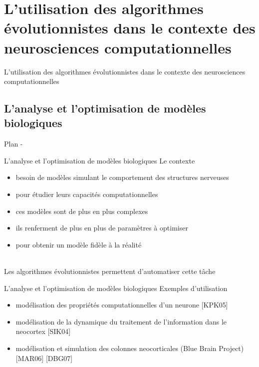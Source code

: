 \documentclass{beamer}
\begin{document}
\section{L'utilisation des algorithmes évolutionnistes dans le contexte des
         neurosciences computationnelles}

\begin{frame}
    \begin{center}
        {\LARGE L'utilisation des algorithmes évolutionnistes dans le contexte
         des neurosciences computationnelles}
    \end{center}
\end{frame}


\subsection{L'analyse et l'optimisation de modèles biologiques}

\begin{frame}{Plan - \secname}
    \tableofcontents[sectionstyle=hide/hide,subsectionstyle=show/shaded/hide]
\end{frame}

\begin{frame}{L'analyse et l'optimisation de modèles biologiques}
    Le contexte
    \begin{itemize}
        \item besoin de modèles simulant le comportement des structures
              nerveuses
        \item pour étudier leurs capacités computationnelles
        \item ces modèles sont de plus en plus complexes
        \item ils renferment de plus en plus de paramètres à optimiser
        \item pour obtenir un modèle fidèle à la réalité
    \end{itemize}
    ~\\
    Les algorithmes évolutionnistes permettent d'automatiser cette tâche
\end{frame}

\begin{frame}{L'analyse et l'optimisation de modèles biologiques}
    Exemples d'utilisation
    \begin{itemize}
        \item modélisation des propriétés computationnelles d'un neurone
              [KPK05]
        \item modélisation de la dynamique du traitement de l'information dans
              le neocortex [SIK04]
        \item modélisation et simulation des colonnes neocorticales (Blue
              Brain Project) [MAR06] [DBG07]
    \end{itemize}
\end{frame}
\end{document}

